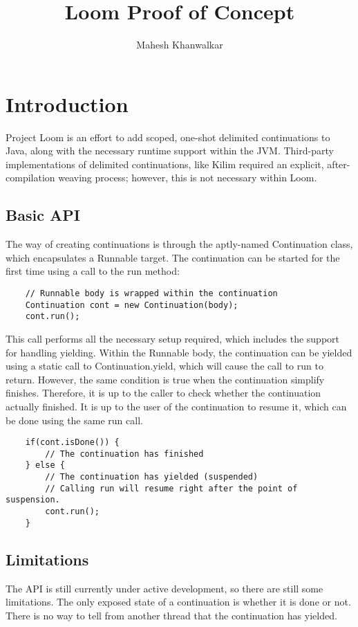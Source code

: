 \documentclass[12pt]{article}
\title{Loom Proof of Concept}
\author{Mahesh Khanwalkar}
\date{}
\begin{document}
    \maketitle
    \section{Introduction}

    Project Loom is an effort to add scoped, one-shot delimited continuations to Java, along with the
    necessary runtime support within the JVM. Third-party implementations of delimited continuations, like
    Kilim required an explicit, after-compilation weaving process; however, this is not necessary within
    Loom.

    \subsection{Basic API}

    The way of creating continuations is through the aptly-named Continuation class, which encapsulates a
    Runnable target. The continuation can be started for the first time using a call to the run method:

    \begin{lstlisting}
    // Runnable body is wrapped within the continuation
    Continuation cont = new Continuation(body); 
    cont.run();
    \end{lstlisting}

    This call performs all the necessary setup required, which includes the support for handling yielding.
    Within the Runnable body, the continuation can be yielded using a static call to Continuation.yield,
    which will cause the call to run to return. However, the same condition is true when the continuation
    simplify finishes. Therefore, it is up to the caller to check whether the continuation actually finished.
    It is up to the user of the continuation to resume it, which can be done using the same run call.

    \begin{lstlisting}
    if(cont.isDone()) {
        // The continuation has finished
    } else {
        // The continuation has yielded (suspended)
        // Calling run will resume right after the point of suspension.
        cont.run();
    }
    \end{lstlisting}

    \subsection{Limitations}
    The API is still currently under active development, so there are still some limitations. The only
    exposed state of a continuation is whether it is done or not. There is no way to tell from another thread
    that the continuation has yielded.
\end{document}
